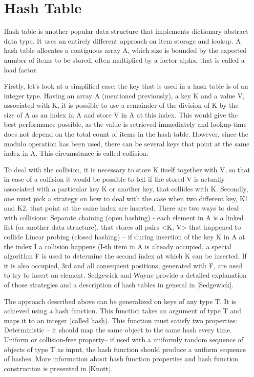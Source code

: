 \section{Hash Table}

Hash table is another popular data structure that implements dictionary abstract data type. It uses an entirely different approach on item storage and lookup. A hash table allocates a contiguous array A, which size is bounded by the expected number of items to be stored, often multiplied by a factor alpha, that is called a load factor.

Firstly, let’s look at a simplified case: the key that is used in a hash table is of an integer type. Having an array A (mentioned previously), a key K and a value V, associated with K, it is possible to use a remainder of the division of K by the size of A as an index in A and store V in A at this index. This would give the best performance possible, as the value is retrieved immediately and lookup-time does not depend on the total count of items in the hash table. However, since the modulo operation has been used, there can be several keys that point at the same index in A. This circumstance is called collision.

To deal with the collision, it is necessary to store K itself together with V, so that in case of a collision it would be possible to tell if the stored V is actually associated with a particular key K or another key, that collides with K. Secondly, one must pick a strategy on how to deal with the case when two different key, K1 and K2, that point at the same index are inserted. There are two ways to deal with collisions:
Separate chaining (open hashing) - each element in A is a linked list (or another data structure), that stores all pairs <K, V> that happened to collide
Linear probing (closed hashing) – if during insertion of the key K in A at the index I a collision happens (I-th item in A is already occupied, a special algorithm F is used to determine the second index at which K can be inserted. If it is also occupied, 3rd and all consequent positions, generated with F, are used to try to insert an element.
Sedgewick and Wayne provide a detailed explanation of those strategies and a description of hash tables in general in [Sedgewick].

The approach described above can be generalized on keys of any type T. It is achieved using a hash function. This function takes an argument of type T and maps it to an integer (called hash). This function must satisfy two properties:
Deterministic – it should map the same object to the same hash every time.
Uniform or collision-free property– if used with a uniformly random sequence of objects of type T as input, the hash function should produce a uniform sequence of hashes.
More information about hash function properties and hash function construction is presented in [Knott].

